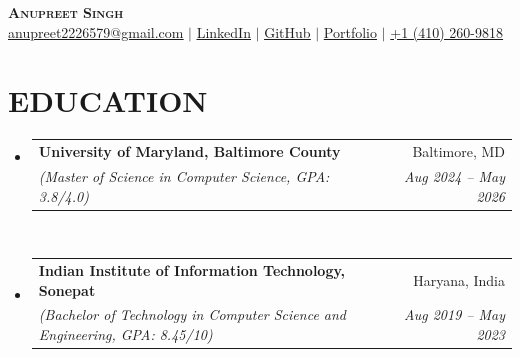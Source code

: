 \documentclass[letterpaper,11pt]{article}
\makeatletter
\newcommand{\SectionListBegin}{\begin{itemize}[leftmargin=0.15in, label={}]}
\newcommand{\SectionListEnd}{\end{itemize}}
\newcommand{\DLSubheadingItem}[4]{
  \vspace{-2pt}\item
    \begin{tabular*}{0.97\textwidth}[t]{l@{\extracolsep{\fill}}r}
      \textbf{#1} & {\small #2} \\
      \textit{\small#3} & \textit{\small #4} \\
    \end{tabular*}\vspace{-7pt}
}
\makeatother
\begin{document}
\begin{center}
	{\textbf{\Huge \scshape Anupreet Singh}} \\ \vspace{1pt}
	\small  \href{mailto:anupreet2226579@gmail.com}{\underline{anupreet2226579@gmail.com}} 
	$|$ 
	\small {\href{https://www.linkedin.com/in/anupreet-singh-71b1861b8/}{\underline{LinkedIn}}}
    $|$ 
	\small {\href{https://github.com/anupreetsingh}{\underline{GitHub}}}
    $|$ 
	\small {\href{https://portfolio-omega-three-hw8q4rw3hx.vercel.app}{\underline{Portfolio}}}
    $|$ 
{\underline{+1 (410) 260-9818}} 
\end{center}


\section{EDUCATION}
  \SectionListBegin
    \DLSubheadingItem
      {University of Maryland, Baltimore County}{Baltimore, MD}
      {(Master of Science in Computer Science, GPA: 3.8/4.0)}{Aug 2024 -- May 2026}\\
    {\vspace{2mm}}
    \DLSubheadingItem
      {Indian Institute of Information Technology, Sonepat}{Haryana, India}
      {(Bachelor of Technology in Computer Science and Engineering, GPA: 8.45/10)}{Aug 2019 -- May 2023} \\
  \SectionListEnd
  

\end{document}

